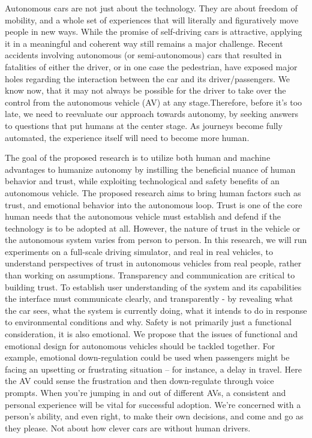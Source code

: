 
Autonomous cars are not just about the technology. They are about freedom of mobility, and a whole set of experiences that will literally and figuratively move people in new ways.
While the promise of self-driving cars is attractive, applying it in a meaningful and coherent way still remains a major challenge. Recent accidents involving autonomous (or semi-autonomous) cars that resulted in fatalities of either the driver, or in one case the pedestrian, have exposed major holes regarding the interaction between the car and its driver/passengers. We know now, that it may not always be possible for the driver to take over the control from the autonomous vehicle (AV) at any stage.Therefore, before it’s too late, we need to reevaluate our approach towards autonomy, by seeking answers to questions that put humans at the center stage. As journeys become fully automated, the experience itself will need to become more human. 

The goal of the proposed research is to utilize both human and machine advantages to humanize autonomy by instilling the beneficial nuance of human behavior and trust, while exploiting technological and safety benefits of an autonomous vehicle. The proposed research aims to bring human factors such as trust, and emotional behavior into the autonomous loop. Trust is one of the core human needs that the autonomous vehicle must establish and defend if the technology is to be adopted at all. However, the nature of trust in the vehicle or the autonomous system varies from person to person. In this research, we will run experiments on a full-scale driving simulator, and real in real vehicles, to understand perspectives of trust in autonomous vehicles from real people, rather than working on assumptions. Transparency and communication are critical to building trust. To establish user understanding of the system and its capabilities the interface must communicate clearly, and transparently - by revealing what the car sees, what the system is currently doing, what it intends to do in response to environmental conditions and why. 
Safety is not primarily just a functional consideration, it is also emotional. We propose that the issues of functional and emotional design for autonomous vehicles should be tackled together.
For example, emotional down-regulation could be used when passengers might be facing an upsetting or frustrating situation – for instance, a delay in travel. Here the AV could sense the frustration and then down-regulate through voice prompts. When you’re jumping in and out of different AVs, a consistent and personal experience will be vital for successful adoption.
 We’re concerned with a person’s ability, and even right, to make their own decisions, and come and go as they please. Not about how clever cars are without human drivers. 

